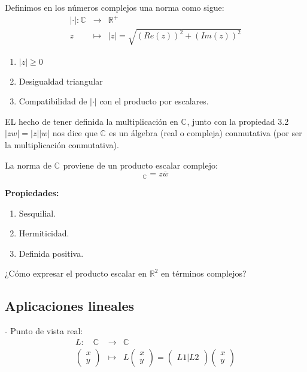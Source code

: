 \begin{definicion}[Norma]
  Definimos en los números complejos una norma como sigue:
  \begin{eqnarray*}
    |\cdot| : \mathbb{C}^{ } & \rightarrow & \mathbb{R}^{+} \\
                           z & \mapsto & |z|=\sqrt{(Re(z))^2+(Im(z))^2}
  \end{eqnarray*}
\end{definicion}


\begin{enumerate}
  \item \(|z| \geq 0 \)
  \item Desigualdad triangular %
  \item Compatibilidad de \( | \cdot | \) con el producto por escalares. 

\end{enumerate}

EL hecho de tener definida la multiplicación en \(\mathbb{C}^{}\), junto con la propiedad 3.2 \(|zw| = |z||w|\) nos dice que \(\mathbb{C}^{}\) es un álgebra (real o compleja) conmutativa (por ser la multiplicación conmutativa).

La norma de \(\mathbb{C}^{}\) proviene de un producto escalar complejo:
\[<z,w>_{\mathbb{C}^{}} = z \overline{w}\]

\textbf{Propiedades:}
\begin{enumerate}
  \item Sesquilial. 
  \item Hermiticidad.
  \item Definida positiva.
\end{enumerate}

¿Cómo expresar el producto escalar en \(\mathbb{R}^{2}\) en términos complejos?

\subsection{Aplicaciones lineales}

- Punto de vista real:
\begin{eqnarray*}
  L : \quad \mathbb{C}^{ } & \rightarrow & \mathbb{C}^{} \\
 \begin{pmatrix}
   x \\
   y
 \end{pmatrix} & \mapsto & L\begin{pmatrix}
   x \\
   y
 \end{pmatrix} = \begin{pmatrix}
   L1 | L2
 \end{pmatrix}\begin{pmatrix}
   x \\
   y
 \end{pmatrix}
\end{eqnarray*}

